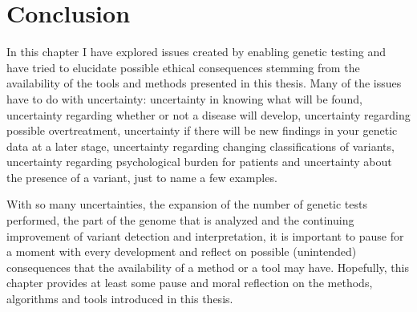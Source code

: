 \section{Conclusion}
In this chapter I have explored issues created by enabling genetic testing and have tried to elucidate possible ethical consequences stemming from the availability of the tools and methods presented in this thesis. 
Many of the issues have to do with uncertainty: uncertainty in knowing what will be found, uncertainty regarding whether or not a disease will develop, uncertainty regarding possible overtreatment, uncertainty if there will be new findings in your genetic data at a later stage, uncertainty regarding changing classifications of variants, uncertainty regarding psychological burden for patients and uncertainty about the presence of a variant, just to name a few examples. 

With so many uncertainties, the expansion of the number of genetic tests performed, the part of the genome that is analyzed and the continuing improvement of variant detection and interpretation, it is important to pause for a moment with every development and reflect on possible (unintended) consequences that the availability of a method or a tool may have. 
Hopefully, this chapter provides at least some pause and moral reflection on the methods, algorithms and tools introduced in this thesis.
